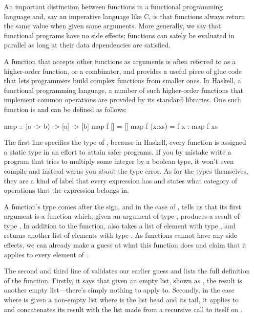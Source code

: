 \documentclass[../main.tex]{subfiles}
\begin{document}
An important distinction between functions in a functional programming language and, say an imperative language like C, is that functions always return the same value when given same arguments. More generally, we say that functional programs have no side effects; functions can safely be evaluated in parallel as long at their data dependencies are satisfied.

A function that accepts other functions as arguments is often referred to as a higher-order function, or a combinator, and provides a useful piece of glue code that lets programmers build complex functions from smaller ones. In Haskell, a functional programming language, a number of such higher-order functions that implement common operations are provided by its standard libraries. One such function is  and can be defined as follows:

\begin{code}
map :: (a -> b) -> [a] -> [b]
map f []     = []
map f (x:xs) = f x : map f xs
\end{code}

The first line specifies the type of , because in Haskell, every function is assigned a static type in an effort to attain safer programs. If you by mistake write a program that tries to multiply some integer by a boolean type, it won't even compile and instead warns you about the type error. As for the types themselves, they are a kind of label that every expression has and states what category of operations that the expression belongs in.

A function's type comes after the \codei{::} sign, and in the case of , tells us that its first argument is a function  which, given an argument of type , produces a result of type . In addition to the function,  also takes a list  of element with type , and returns another list of elements with type . As functions cannot have any side effects, we can already make a guess at what this function does and claim that it applies  to every element of .

The second and third line of  validates our earlier guess and lists the full definition of the function. Firstly, it says that given an empty list, shown as \codei{[]}, the result is another empty list---there's simply nothing to apply  to. Secondly, in the case where  is given a non-empty list  where  is the list head and  its tail, it applies  to  and concatenates its result with the list made from a recursive call to itself on .
\end{document}
